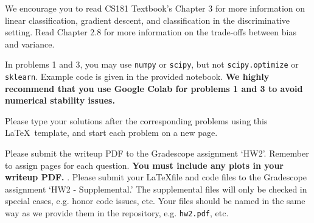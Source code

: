 \documentclass[submit]{../harvardml}
\begin{document}
We encourage you to read CS181 Textbook's Chapter 3 for more information on linear classification, gradient descent, and classification in the discriminative setting. Read Chapter 2.8 for more information on the trade-offs between bias and variance.

In problems 1 and 3, you may use \texttt{numpy} or \texttt{scipy}, but not \texttt{scipy.optimize} or \texttt{sklearn}. Example code is given in the provided notebook. \textbf{We highly recommend that you use Google Colab for problems 1 and 3 to avoid numerical stability issues.}

Please type your solutions after the corresponding problems using this \LaTeX\ template, and start each problem on a new page.

Please submit the writeup PDF to the Gradescope assignment `HW2'. Remember to assign pages for each question.  \textbf{You must include any plots in your writeup PDF. }. Please submit your \LaTeX file and code files to the Gradescope assignment `HW2 - Supplemental.' The supplemental files will only be checked in special cases, e.g. honor code issues, etc. Your files should be named in the same way as we provide them in the repository, e.g. \texttt{hw2.pdf}, etc.



\end{document}
